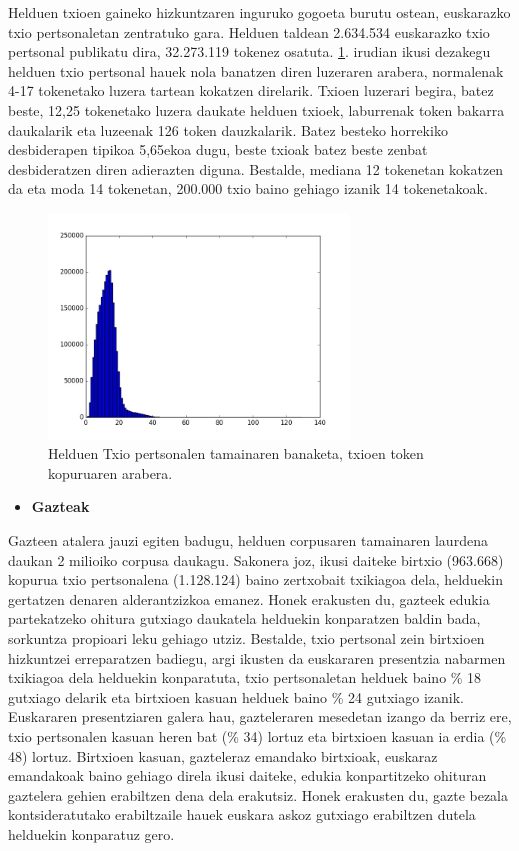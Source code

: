 \documentclass[information,article,submit,moreauthors,pdftex,10pt,a4paper]{Definitions/mdpi}
\begin{document}
\indent Helduen txioen gaineko hizkuntzaren inguruko gogoeta burutu ostean, euskarazko txio pertsonaletan zentratuko gara. Helduen taldean 2.634.534 euskarazko txio pertsonal publikatu dira, 32.273.119 tokenez osatuta. \ref{fig:txio luze held}. irudian ikusi dezakegu helduen txio pertsonal hauek nola banatzen diren luzeraren arabera, normalenak 4-17 tokenetako luzera tartean kokatzen direlarik. Txioen luzerari begira, batez beste, 12,25 tokenetako luzera daukate helduen txioek, laburrenak token bakarra daukalarik eta luzeenak 126 token dauzkalarik. Batez besteko horrekiko desbiderapen tipikoa 5,65ekoa dugu, beste txioak batez beste zenbat desbideratzen diren adierazten diguna. Bestalde, mediana 12 tokenetan kokatzen da eta moda 14 tokenetan, 200.000 txio baino gehiago izanik 14 tokenetakoak.

\begin{figure}[H]
  \centering
  \includegraphics[height=6cm]{graf_for}
  \caption{Helduen Txio pertsonalen tamainaren banaketa, txioen token kopuruaren arabera.}
  \label{fig:txio luze held}
\end{figure}

\begin{itemize}
\item \textbf{Gazteak} 
\end{itemize}

\indent Gazteen atalera jauzi egiten badugu, helduen corpusaren tamainaren laurdena daukan 2 milioiko corpusa daukagu. Sakonera joz, ikusi daiteke birtxio (963.668) kopurua txio pertsonalena (1.128.124) baino zertxobait txikiagoa dela, helduekin gertatzen denaren alderantzizkoa emanez. Honek erakusten du, gazteek edukia partekatzeko ohitura gutxiago daukatela helduekin konparatzen baldin bada, sorkuntza propioari leku gehiago utziz. Bestalde, txio pertsonal zein birtxioen hizkuntzei erreparatzen badiegu, argi ikusten da euskararen presentzia nabarmen txikiagoa dela helduekin konparatuta, txio pertsonaletan helduek baino \% 18 gutxiago delarik eta birtxioen kasuan helduek baino \% 24 gutxiago izanik. Euskararen presentziaren galera hau, gazteleraren mesedetan izango da berriz ere, txio pertsonalen kasuan heren bat (\% 34) lortuz eta birtxioen kasuan ia erdia (\% 48) lortuz. Birtxioen kasuan, gazteleraz emandako birtxioak, euskaraz emandakoak baino gehiago direla ikusi daiteke, edukia konpartitzeko ohituran gaztelera gehien erabiltzen dena dela erakutsiz. Honek erakusten du, gazte bezala kontsideratutako erabiltzaile hauek euskara askoz gutxiago erabiltzen dutela helduekin konparatuz gero.
\end{document}
